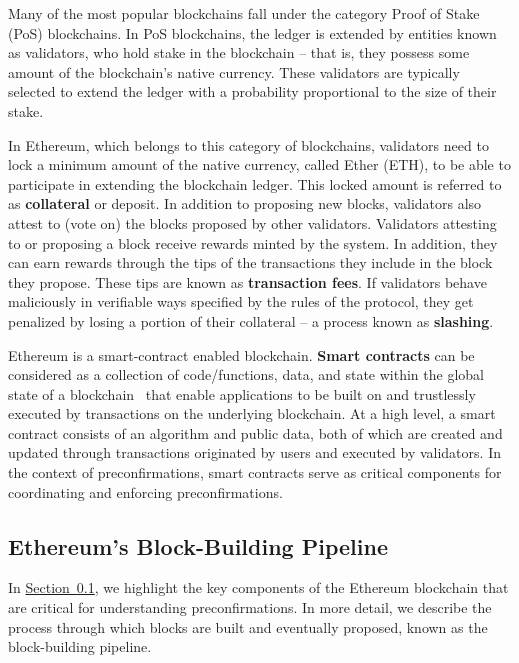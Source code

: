 \documentclass[a4paper]{article}
\theoremstyle{boldstyle}
\begin{document}
    Many of the most popular blockchains fall under the category Proof of Stake (PoS) blockchains. In PoS blockchains, the ledger is extended by entities known as validators, who hold stake in the blockchain -- that is, they possess some amount of the blockchain’s native currency. These validators are typically selected to extend the ledger with a probability proportional to the size of their stake. 
    
    In Ethereum, which belongs to this category of blockchains, validators need to lock a minimum amount of the native currency, called Ether (ETH), to be able to participate in extending the blockchain ledger. This locked amount is referred to as \textbf{collateral} or deposit. In addition to proposing new blocks, validators also attest to (vote on) the blocks proposed by other validators. Validators attesting to or proposing a block receive rewards minted by the system. In addition, they can earn rewards through the tips of the transactions they include in the block they propose. These tips are known as \textbf{transaction fees}. If validators behave maliciously in verifiable ways specified by the rules of the protocol, they get penalized by losing a portion of their collateral -- a process known as \textbf{slashing}. 
    
    Ethereum is a smart-contract enabled blockchain. \textbf{Smart contracts} can be considered as a collection of code/functions, data, and state within the global state of a blockchain~\cite{W:IntroductionToSmartContracts} that enable applications to be built on and trustlessly executed by transactions on the underlying blockchain. At a high level, a smart contract consists of an algorithm and public data, both of which are created and updated through transactions originated by users and executed by validators. In the context of preconfirmations, smart contracts serve as critical components for coordinating and enforcing preconfirmations.
   
 
    \subsection{Ethereum's Block-Building Pipeline}
    \label{sec:L1_pipeline}
    
    In \hyperref[sec:L1_pipeline]{Section~\ref{sec:L1_pipeline}}, we highlight the key components of the Ethereum blockchain that are critical for understanding preconfirmations. In more detail, we describe the process through which blocks are built and eventually proposed, known as the block-building pipeline. 
    
\end{document}

